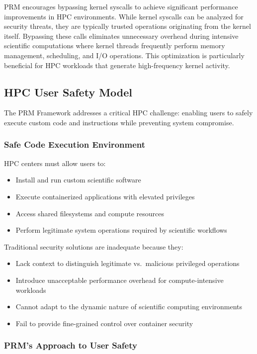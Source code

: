 \documentclass[]{sn-jnl}
\begin{document}
PRM encourages bypassing kernel syscalls to achieve significant performance
improvements in HPC environments. While kernel syscalls can be analyzed for
security threats, they are typically trusted operations originating from the
kernel itself. Bypassing these calls eliminates unnecessary overhead during
intensive scientific computations where kernel threads frequently perform memory
management, scheduling, and I/O operations. This optimization is particularly
beneficial for HPC workloads that generate high-frequency kernel activity.

\subsection{HPC User Safety Model}

The PRM Framework addresses a critical HPC challenge: enabling users to safely
execute custom code and instructions while preventing system compromise.

\subsubsection{Safe Code Execution Environment}

HPC centers must allow users to:
\begin{itemize}
\item Install and run custom scientific software
\item Execute containerized applications with elevated privileges
\item Access shared filesystems and compute resources
\item Perform legitimate system operations required by scientific workflows
\end{itemize}

Traditional security solutions are inadequate because they:
\begin{itemize}
\item Lack context to distinguish legitimate vs.\ malicious privileged operations
\item Introduce unacceptable performance overhead for compute-intensive workloads
\item Cannot adapt to the dynamic nature of scientific computing environments
\item Fail to provide fine-grained control over container security
\end{itemize}

\subsubsection{PRM's Approach to User Safety}
\end{document}
